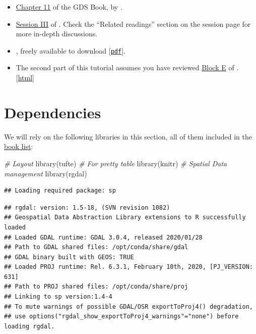 \documentclass[
]{book}
\newenvironment{Shaded}{\begin{snugshade}}{\end{snugshade}}
\newcommand{\CommentTok}[1]{\textcolor[rgb]{0.56,0.35,0.01}{\textit{#1}}}
\newcommand{\FunctionTok}[1]{\textcolor[rgb]{0.00,0.00,0.00}{#1}}
\newcommand{\NormalTok}[1]{#1}
\providecommand{\tightlist}{%
  \setlength{\itemsep}{0pt}\setlength{\parskip}{0pt}}
\begin{document}
\begin{itemize}
\tightlist
\item
  \href{https://geographicdata.science/book/notebooks/11_regression.html}{Chapter 11} of the GDS Book, by \citet{reyABwolf}.
\item
  \href{http://darribas.org/sdar_mini/notes/Class_03.html}{Session III} of \citet{arribas2014spatial}. Check the ``Related readings'' section on the session page for more in-depth discussions.
\item
  \citet{anselin2005spatial}, freely available to download {[}\href{http://csiss.org/GISPopSci/workshops/2011/PSU/readings/W15_Anselin2007.pdf}{\texttt{pdf}}{]}.
\item
  The second part of this tutorial assumes you have reviewed \href{https://darribas.org/gds_course/content/bE/concepts_E.html}{Block E} of \citet{darribas_gds_course}. {[}\href{https://darribas.org/gds_course/content/bE/concepts_E.html}{html}{]}
\end{itemize}

\hypertarget{dependencies-3}{%
\section{Dependencies}\label{dependencies-3}}

We will rely on the following libraries in this section, all of them included in the \protect\hyperlink{Dependency-list}{book list}:

\begin{Shaded}
\begin{Highlighting}[]
\CommentTok{\# Layout}
\FunctionTok{library}\NormalTok{(tufte)}
\CommentTok{\# For pretty table}
\FunctionTok{library}\NormalTok{(knitr)}
\CommentTok{\# Spatial Data management}
\FunctionTok{library}\NormalTok{(rgdal)}
\end{Highlighting}
\end{Shaded}

\begin{verbatim}
## Loading required package: sp
\end{verbatim}

\begin{verbatim}
## rgdal: version: 1.5-18, (SVN revision 1082)
## Geospatial Data Abstraction Library extensions to R successfully loaded
## Loaded GDAL runtime: GDAL 3.0.4, released 2020/01/28
## Path to GDAL shared files: /opt/conda/share/gdal
## GDAL binary built with GEOS: TRUE 
## Loaded PROJ runtime: Rel. 6.3.1, February 10th, 2020, [PJ_VERSION: 631]
## Path to PROJ shared files: /opt/conda/share/proj
## Linking to sp version:1.4-4
## To mute warnings of possible GDAL/OSR exportToProj4() degradation,
## use options("rgdal_show_exportToProj4_warnings"="none") before loading rgdal.
\end{verbatim}
\end{document}
